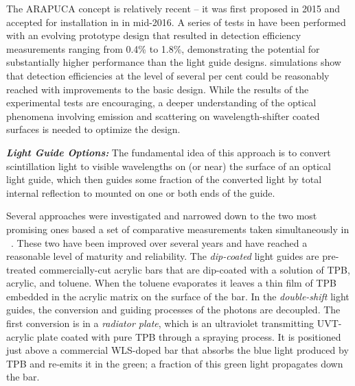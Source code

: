 
The ARAPUCA concept is relatively recent -- it was first proposed in 2015 and accepted for installation in  in mid-2016. A series of tests in \lar have been performed with an evolving prototype design that resulted in detection efficiency measurements ranging from  \num{0.4}\% to \num{1.8}\%, demonstrating the potential for substantially higher performance than the light guide designs.  simulations show that detection efficiencies at the level of several per cent could be reasonably reached with improvements to the basic design. 
While the results of the experimental tests are encouraging, a deeper understanding of the optical phenomena involving emission and scattering on wavelength-shifter coated surfaces is needed to optimize the design.

\textit{\bf Light Guide Options:} The fundamental idea of this approach is to convert  scintillation light to visible wavelengths on (or near) the surface of an optical light guide, which then guides some fraction of the converted light by total internal reflection to  mounted on one or both ends of the guide.

Several approaches were investigated and narrowed down to the two most promising ones based a set of comparative measurements taken simultaneously in \lar~\cite{Whittington:2015rkr}. These two have been improved over several years and have reached a reasonable level of maturity and reliability.
The \textit{ dip-coated} light guides are pre-treated commercially-cut acrylic bars that are dip-coated with a solution of TPB, acrylic, and toluene. When the toluene evaporates it leaves a thin film of TPB embedded in the acrylic matrix on the surface of the bar.  In the \textit{double-shift} light guides, the conversion and guiding processes of the photons are decoupled. The first conversion is in a \textit{ radiator plate}, which is an ultraviolet transmitting UVT-acrylic plate coated with pure TPB through a spraying process. It is positioned 
just above a commercial WLS-doped bar that absorbs the blue light produced by TPB and re-emits it in the green; a fraction of this green light propagates down the bar. 

